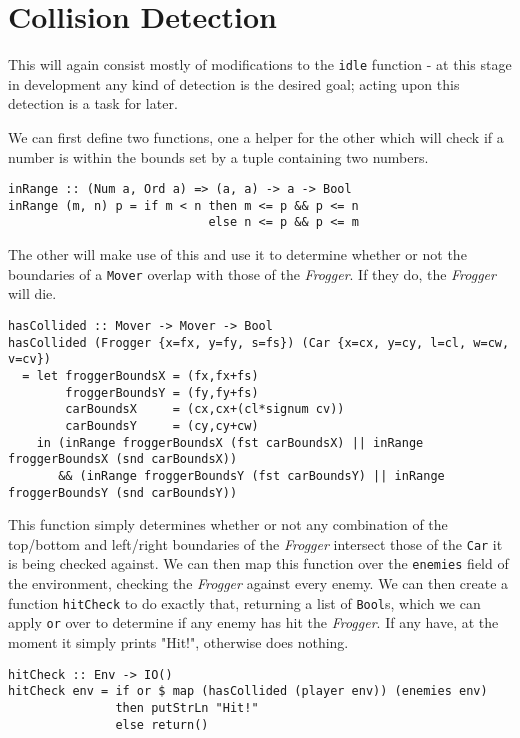 \documentclass[12pt, a4paper]{report}
\begin{document}
\section{Collision Detection}

This will again consist mostly of modifications to the \verb|idle| function - at this stage in development any kind of detection is the desired goal; acting upon this detection is a task for later.

We can first define two functions, one a helper for the other which will check if a number is within the bounds set by a tuple containing two numbers.

\begin{lstlisting}
inRange :: (Num a, Ord a) => (a, a) -> a -> Bool
inRange (m, n) p = if m < n then m <= p && p <= n
                            else n <= p && p <= m
\end{lstlisting}

The other will make use of this and use it to determine whether or not the boundaries of a \verb|Mover| overlap with those of the \textit{Frogger}.
If they do, the \textit{Frogger} will die.

\begin{lstlisting}
hasCollided :: Mover -> Mover -> Bool
hasCollided (Frogger {x=fx, y=fy, s=fs}) (Car {x=cx, y=cy, l=cl, w=cw, v=cv})
  = let froggerBoundsX = (fx,fx+fs)
        froggerBoundsY = (fy,fy+fs)
        carBoundsX     = (cx,cx+(cl*signum cv))
        carBoundsY     = (cy,cy+cw)
    in (inRange froggerBoundsX (fst carBoundsX) || inRange froggerBoundsX (snd carBoundsX))
       && (inRange froggerBoundsY (fst carBoundsY) || inRange froggerBoundsY (snd carBoundsY))
\end{lstlisting}

This function simply determines whether or not any combination of the top/bottom and left/right boundaries of the \textit{Frogger} intersect those of the \verb|Car| it is being checked against.
We can then map this function over the \verb|enemies| field of the environment, checking the \textit{Frogger} against every enemy.
We can then create a function \verb|hitCheck| to do exactly that, returning a list of \verb|Bool|s, which we can apply \verb|or| over to determine if any enemy has hit the \textit{Frogger}.
If any have, at the moment it simply prints "Hit!", otherwise does nothing.

\begin{lstlisting}
hitCheck :: Env -> IO()
hitCheck env = if or $ map (hasCollided (player env)) (enemies env)
               then putStrLn "Hit!"
               else return()
\end{lstlisting}
\end{document}
